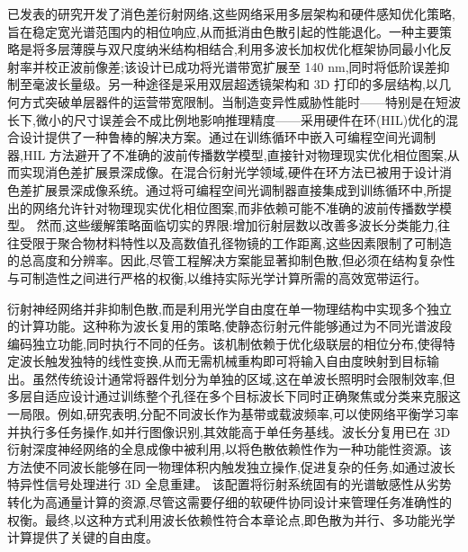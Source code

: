 \documentclass[11pt]{article}
\begin{document}
已发表的研究开发了消色差衍射网络,这些网络采用多层架构和硬件感知优化策略,旨在稳定宽光谱范围内的相位响应,从而抵消由色散引起的性能退化。一种主要策略是将多层薄膜与双尺度纳米结构相结合,利用多波长加权优化框架协同最小化反射率并校正波前像差;该设计已成功将光谱带宽扩展至 140 nm,同时将低阶误差抑制至毫波长量级。另一种途径是采用双层超透镜架构和 3D 打印的多层结构,以几何方式突破单层器件的运营带宽限制。当制造变异性威胁性能时------特别是在短波长下,微小的尺寸误差会不成比例地影响推理精度------采用硬件在环(HIL)优化的混合设计提供了一种鲁棒的解决方案。通过在训练循环中嵌入可编程空间光调制器,HIL 方法避开了不准确的波前传播数学模型,直接针对物理现实优化相位图案,从而实现消色差扩展景深成像。在混合衍射光学领域,硬件在环方法已被用于设计消色差扩展景深成像系统。通过将可编程空间光调制器直接集成到训练循环中,所提出的网络允许针对物理现实优化相位图案,而非依赖可能不准确的波前传播数学模型。\citep{doi_10_1364_oe_461549_b2d41b3f} 然而,这些缓解策略面临切实的界限:增加衍射层数以改善多波长分类能力,往往受限于聚合物材料特性以及高数值孔径物镜的工作距离,这些因素限制了可制造的总高度和分辨率。因此,尽管工程解决方案能显著抑制色散,但必须在结构复杂性与可制造性之间进行严格的权衡,以维持实际光学计算所需的高效宽带运行。\citep{doi_10_1002_adpr_202300310_6647aa64} \citep{doi_10_3390_modelling7010029_9851fe61} \citep{doi_10_1364_oe_461549_b2d41b3f} \citep{doi_10_29026_oea_2021_200008_8948c2c3} \citep{doi_10_1126_sciadv_adj9262_15884f2e}

衍射神经网络并非抑制色散,而是利用光学自由度在单一物理结构中实现多个独立的计算功能。这种称为波长复用的策略,使静态衍射元件能够通过为不同光谱波段编码独立功能,同时执行不同的任务。该机制依赖于优化级联层的相位分布,使得特定波长触发独特的线性变换,从而无需机械重构即可将输入自由度映射到目标输出。虽然传统设计通常将器件划分为单独的区域,这在单波长照明时会限制效率,但多层自适应设计通过训练整个孔径在多个目标波长下同时正确聚焦或分类来克服这一局限。例如,研究表明,分配不同波长作为基带或载波频率,可以使网络平衡学习率并执行多任务操作,如并行图像识别,其效能高于单任务基线。波长分复用已在 3D 衍射深度神经网络的全息成像中被利用,以将色散依赖性作为一种功能性资源。该方法使不同波长能够在同一物理体积内触发独立操作,促进复杂的任务,如通过波长特异性信号处理进行 3D 全息重建。\citep{doi_10_1109_acp_ipoc63121_2024_10809872_a7935774} 该配置将衍射系统固有的光谱敏感性从劣势转化为高通量计算的资源,尽管这需要仔细的软硬件协同设计来管理任务准确性的权衡。最终,以这种方式利用波长依赖性符合本章论点,即色散为并行、多功能光学计算提供了关键的自由度。\citep{doi_10_1038_s41377_022_00903_8_098356a7} \citep{doi_10_1364_prj_576203_ae347fba} \citep{doi_10_1364_ol_460186_da35c128} \citep{doi_10_1155_2020_9748380_13fcb0d2} \citep{s2_88f87b34acdb11cf20ad16d6fbdd5399e8617f8f_a548a720}
\end{document}
